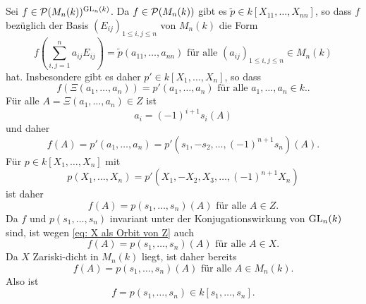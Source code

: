 \documentclass[a4paper,10pt]{article}
\begin{document}
\subsection{}
Sei $f \in \mathcal{P}(M_n(k))^{\operatorname{GL}_n(k)}$. Da $f \in \mathcal{P}(M_n(k))$ gibt es $\tilde{p} \in k[X_{11}, \ldots, X_{nn}]$, so dass $f$ bezüglich der Basis $(E_{ij})_{1 \leq i,j \leq n}$ von $M_n(k)$ die Form
\[
 f\left( \sum_{i,j=1}^n a_{ij} E_{ij} \right) = \tilde{p}(a_{11}, \ldots, a_{nn}) \text{ für alle } (a_{ij})_{1 \leq i,j \leq n} \in M_n(k)
\]
hat. Insbesondere gibt es daher $p' \in k[X_1, \ldots, X_n]$, so dass
\[
 f\left( \Xi(a_1, \ldots, a_n) \right) = p'(a_1, \ldots, a_n) \text{ für alle } a_1, \ldots, a_n \in k..
\]
Für alle $A = \Xi(a_1, \ldots, a_n) \in Z$ ist
\[
 a_i = (-1)^{i+1} s_i(A)
\]
und daher
\[
 f(A) = p'(a_1, \ldots, a_n) = p'\left(s_1, -s_2, \ldots, (-1)^{n+1} s_n\right)(A).
\]
Für $p \in k[X_1, \ldots, X_n]$ mit
\[
 p(X_1, \ldots, X_n) = p'(X_1, -X_2, X_3, \ldots, (-1)^{n+1} X_n)
\]
ist daher
\[
 f(A) = p(s_1, \ldots, s_n)(A) \text{ für alle } A \in Z.
\]
Da $f$ und $p(s_1, \ldots, s_n)$ invariant unter der Konjugationswirkung von $\operatorname{GL}_n(k)$ sind, ist wegen \eqref{eq: X als Orbit von Z} auch
\[
 f(A) = p(s_1, \ldots, s_n)(A) \text{ für alle } A \in X.
\]
Da $X$ Zariski-dicht in $M_n(k)$ liegt, ist daher bereits
\[
 f(A) = p(s_1, \ldots, s_n)(A) \text{ für alle } A \in M_n(k).
\]
Also ist
\[
 f = p(s_1, \ldots, s_n) \in k[s_1, \ldots, s_n].
\]
\end{document}
